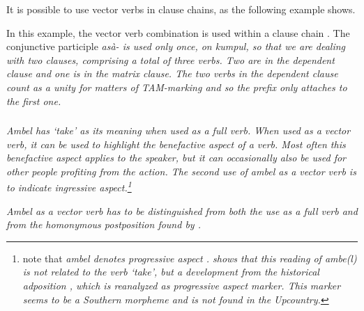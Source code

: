 It is possible to use vector verbs in clause chains, as the following example shows.


In this example, the vector verb combination  is used within a clause chain . The conjunctive participle \em asà- \em  is used only once, on \em kumpul\em, so that we are dealing with two clauses, comprising a total of three verbs. Two are in the dependent clause and one is in the matrix clause. The two verbs in the dependent clause count as a unity for matters of TAM-marking and so the prefix only attaches to the first one.



\subsubsection{}\label{sec:wc:ambel}
\em Ambel \em has `take' as its meaning when used as a full verb. When used as a vector verb,  it can be used to highlight the benefactive aspect of a verb. Most often this benefactive aspect applies to the speaker, but it can occasionally also be used for other people profiting from the action. The second use of \em ambel \em as a vector verb is to indicate ingressive aspect.\footnote{\citet{SmithEtAl2004} note that \em ambel \em denotes progressive aspect  \citep[also see][]{Ansaldo2009book}. \citet{Slomanson2008ismil} shows that this reading of \em ambe(l) \em is not related to the verb `take', but a development from  the historical adposition , which is reanalyzed as progressive aspect marker. This marker  seems to be a Southern morpheme and is not found in the Upcountry.}

\em Ambel \em as a vector verb has to be distinguished from both the use as a full verb and from the homonymous postposition found by \citet{Slomanson2008ismil}.

